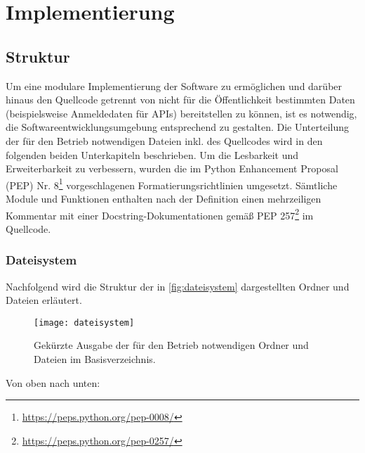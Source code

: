 \chapter{Implementierung}
\label{cha:implementierung}

\section{Struktur}

Um eine modulare Implementierung der Software zu ermöglichen und darüber hinaus den Quellcode getrennt von nicht für die Öffentlichkeit bestimmten Daten (beispielsweise Anmeldedaten für APIs) bereitstellen zu können, ist es notwendig, die Softwareentwicklungsumgebung entsprechend zu gestalten. Die Unterteilung der für den Betrieb notwendigen Dateien inkl. des Quellcodes wird in den folgenden beiden Unterkapiteln beschrieben. Um die Lesbarkeit und Erweiterbarkeit zu verbessern, wurden die im Python Enhancement Proposal (PEP) Nr. 8\footnote{\url{https://peps.python.org/pep-0008/}} vorgeschlagenen Formatierungsrichtlinien umgesetzt. Sämtliche Module und Funktionen enthalten nach der Definition einen mehrzeiligen Kommentar mit einer Docstring-Dokumentationen gemäß PEP 257\footnote{\url{https://peps.python.org/pep-0257/}} im Quellcode.

\subsection{Dateisystem}

Nachfolgend wird die Struktur der in \autoref{fig:dateisystem} dargestellten Ordner und Dateien erläutert.

\begin{figure}[h!]
\centering
\texttt{[image: dateisystem]}
\caption{Gekürzte Ausgabe der für den Betrieb notwendigen Ordner und Dateien im Basisverzeichnis.}
\label{fig:dateisystem}
\end{figure}

Von oben nach unten: 

